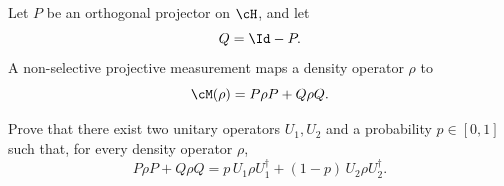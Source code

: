 Let $P$ be an orthogonal projector on $\cH$, and let
$$
Q=\Id-P.
$$
A non-selective projective measurement maps a density operator $\rho$ to
$$
\cM(\rho)
=
P\rho P+Q\rho Q.
$$

Prove that there exist two unitary operators $U_1,U_2$ and a probability $p\in[0,1]$ such that, for every density operator $\rho$,
$$
P\rho P+Q\rho Q
=
p\,U_1\rho U_1^\dagger
+
(1-p)\,U_2\rho U_2^\dagger.
$$
